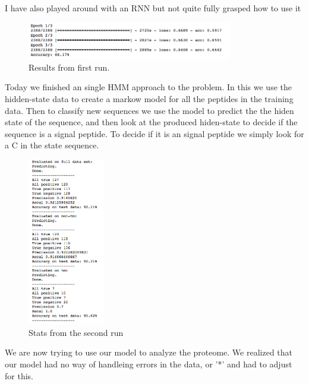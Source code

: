 \documentclass[a4paper]{tufte-handout}
\begin{document}
I have also played around with an RNN but not quite fully grasped how to use it 

\begin{figure}
    \begin{center}
      \includegraphics[width=0.8\textwidth]{./pics/first_run.png}
    \end{center}
    \caption{Results from first run.}
\end{figure}





Today we finished an single HMM approach to the problem. In this we use the
hidden-state data to create a markow model for all the peptides in the training
data. Then to classify new sequences we use the model to predict the the hiden
state of the sequence, and then look at the produced hiden-state to decide if
the sequence is a signal peptide. To decide if it is an signal peptide we simply look for a C in the state sequence.

\begin{figure}
    \begin{center}
      \includegraphics[width=0.3\textwidth]{pics/second_hmm_run.png}
    \end{center}
    \caption{Stats from the second run}
\end{figure}


We are now trying to use our model to analyze the proteome. We realized that
our model had no way of handleing errors in the data, or '*' and had to adjust
for this. 
\end{document}
